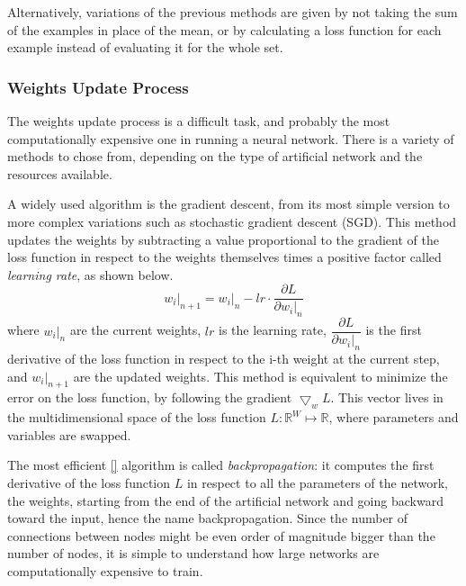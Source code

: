 Alternatively, variations of the previous methods are given by not taking the sum of the examples in place of the mean, or by calculating a loss function for each example instead of evaluating it for the whole set.

\subsubsection{Weights Update Process}
\label{sssec:Weights_Update_Process}

The weights update process is a difficult task, and probably the most computationally expensive one in running a neural network.
There is a variety of methods to chose from, depending on the type of artificial network and the resources available.

A widely used algorithm is the gradient descent, from its most simple version to more complex variations such as stochastic gradient descent (SGD).
This method updates the weights by subtracting a value proportional to the gradient of the loss function in respect to the weights themselves times a positive factor called \textit{learning rate}, as shown below.
\begin{equation}
	\left.w_i\right|_{n+1} = \left.w_i\right|_n - lr \cdot \frac{\partial L}{\partial \left.w_i\right|_n}
\end{equation}
where $\left.w_i\right|_{n}$ are the current weights, $lr$ is the learning rate, $\dfrac{\partial L}{\partial \left.w_i\right|_n}$ is the first derivative of the loss function in respect to the i-th weight at the current step, and $\left.w_i\right|_{n+1}$ are the updated weights.
This method is equivalent to minimize the error on the loss function, by following the gradient $\bigtriangledown_w L$.
This vector lives in the multidimensional space of the loss function $L:\mathbb{R}^W \mapsto \mathbb{R}$, where parameters and variables are swapped.

The most efficient \ref{} algorithm is called \textit{backpropagation}: it computes the first derivative of the loss function $L$ in respect to all the parameters of the network, the weights, starting from the end of the artificial network and going backward toward the input, hence the name backpropagation.
Since the number of connections between nodes might be even order of magnitude bigger than the number of nodes, it is simple to understand how large networks are computationally expensive to train.

